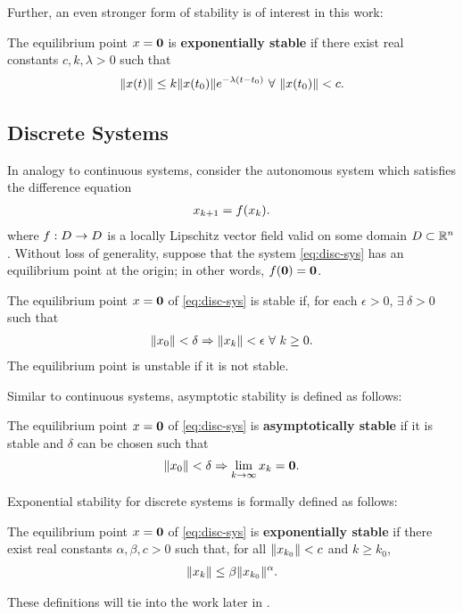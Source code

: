Further, an even stronger form of stability is of interest in this work:
%
\begin{definition}
  The equilibrium point $x = {\mathbf 0}$ is {\bf exponentially stable} if there
  exist real constants $c, k, \lambda > 0$ such that
  \begin{align*}
    \nxt \leq k \nxtnaught e^{-\lambda (t - t_{0})} \ \forall \ \nxtnaught < c.
  \end{align*}
\end{definition}


\subsection{Discrete Systems}

In analogy to continuous systems, consider the autonomous system which satisfies
the difference equation
\begin{align}
  \label{eq:disc-sys}
  x_{k+1} = f(x_{k}).
\end{align}
where $f : D \to D$ is a locally Lipschitz vector field valid on some domain
$D \subset \mathbb{R}^{n}$.
%
Without loss of generality, suppose that the system \eqref{eq:disc-sys} has an
equilibrium point at the origin;
%
in other words, $f({\mathbf 0}) = {\mathbf 0}$.
%
\begin{definition}
  The equilibrium point $x = {\mathbf 0}$ of \eqref{eq:disc-sys} is stable if,
  for each $\epsilon > 0$, $\exists \ \delta > 0$ such that
  \begin{align*}
    \|x_{0}\| < \delta \Rightarrow \|x_{k}\| < \epsilon \ \forall \ k
    \geq 0.
  \end{align*}
  The equilibrium point is unstable if it is not stable.
\end{definition}
%
Similar to continuous systems, asymptotic stability is defined as follows:
%
\begin{definition}
  The equilibrium point $x = {\mathbf 0}$ of \eqref{eq:disc-sys} is {\bf
    asymptotically stable} if it is stable and $\delta$ can be chosen such that
  \begin{align*}
    \|x_{0}\| < \delta \Rightarrow \lim_{k \to \infty} x_{k} = {\mathbf 0}.
  \end{align*}
\end{definition}
%
Exponential stability for discrete systems is formally defined as follows:
%
\begin{definition}
  The equilibrium point $x = {\mathbf 0}$ of \eqref{eq:disc-sys} is {\bf
    exponentially stable} if there exist real constants $\alpha, \beta, c> 0$
  such that, for all $\|x_{k_{0}}\| < c$ and $k \geq k_{0}$,
  \begin{align*}
    \|x_{k}\| \leq \beta \|x_{k_{0}}\|^{\alpha}.
  \end{align*}
\end{definition}
%
These definitions will tie into the work later in .



